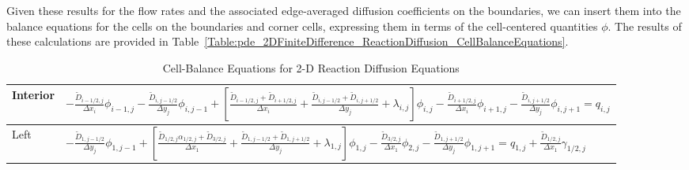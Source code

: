 Given these results for the flow rates and the associated edge-averaged diffusion coefficients on the boundaries, we can insert them into the balance equations for the cells on the boundaries and corner cells, expressing them in terms of the cell-centered quantities $\phi$. The results of these calculations are provided in Table~\ref{Table:pde_2DFiniteDifference_ReactionDiffusion_CellBalanceEquations}.


\begingroup
\renewcommand{\arraystretch}{2.2}
\begin{sidewaystable}[tb!]
\scriptsize
\caption{Cell-Balance Equations for 2-D Reaction Diffusion Equations}
\begin{center}
\begin{tabular}{|p{2cm}|l|}  \hline
  Interior & $- \frac{\widetilde{D}_{i-1/2,j}}{\Delta x_i} \phi_{i-1,j} -  \frac{\widetilde{D}_{i,j-1/2}}{\Delta y_j} \phi_{i,j-1} 
  + \left[ \frac{ \widetilde{D}_{i-1/2,j} + \widetilde{D}_{i+1/2,j} }{ \Delta x_i } + \frac{ \widetilde{D}_{i,j-1/2} + \widetilde{D}_{i,j+1/2} }{ \Delta y_j } + \lambda_{i,j}  \right] \phi_{i,j} 
  - \frac{\widetilde{D}_{i+1/2,j}}{\Delta x_i} \phi_{i+1,j} -  \frac{\widetilde{D}_{i,j+1/2}}{\Delta y_j} \phi_{i,j+1} = q_{i,j} $  \\ \hline
  Left 		& $ -  \frac{\widetilde{D}_{1,j-1/2}}{\Delta y_j} \phi_{1,j-1} + \left[ \frac{ \widetilde{D}_{1/2,j} \alpha_{1/2,j} + \widetilde{D}_{3/2,j} }{ \Delta x_1 } + \frac{ \widetilde{D}_{1,j-1/2} + \widetilde{D}_{1,j+1/2} }{ \Delta y_j } + \lambda_{1,j}  \right] \phi_{1,j} 
  - \frac{\widetilde{D}_{3/2,j}}{\Delta x_1} \phi_{2,j} -  \frac{\widetilde{D}_{1,j+1/2}}{\Delta y_j} \phi_{1,j+1} 
  = q_{1,j} + \frac{ \widetilde{D}_{1/2,j} }{ \Delta x_1 } \gamma_{1/2,j} $ \\ \hline

\end{tabular}
\end{center}
\end{sidewaystable}
